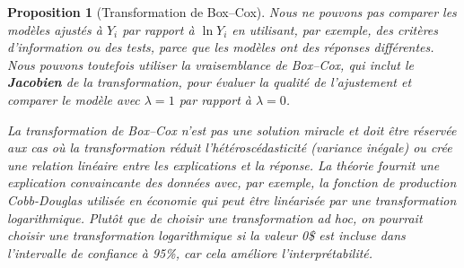 \documentclass[
  11pt,
  letterpaper,
]{scrbook}
\theoremstyle{definition}
\theoremstyle{plain}
\newtheorem{proposition}{Proposition}[chapter]
\theoremstyle{definition}
\theoremstyle{plain}
\theoremstyle{remark}
\begin{document}
\begin{proposition}[Transformation de
Box--Cox]
Nous ne pouvons pas comparer les modèles ajustés à \(Y_i\) par rapport à
\(\ln Y_i\) en utilisant, par exemple, des critères d'information ou des
tests, parce que les modèles ont des réponses différentes. Nous pouvons
toutefois utiliser la vraisemblance de Box--Cox, qui inclut le
\textbf{Jacobien} de la transformation, pour évaluer la qualité de
l'ajustement et comparer le modèle avec \(\lambda=1\) par rapport à
\(\lambda=0\).

La transformation de Box--Cox n'est pas une solution miracle et doit
être réservée aux cas où la transformation réduit l'hétéroscédasticité
(variance inégale) ou crée une relation linéaire entre les explications
et la réponse. La théorie fournit une explication convaincante des
données avec, par exemple, la fonction de production Cobb-Douglas
utilisée en économie qui peut être linéarisée par une transformation
logarithmique. Plutôt que de choisir une transformation \emph{ad hoc},
on pourrait choisir une transformation logarithmique si la valeur 0\$
est incluse dans l'intervalle de confiance à 95\%, car cela améliore
l'interprétabilité.

\end{proposition}
\end{document}
